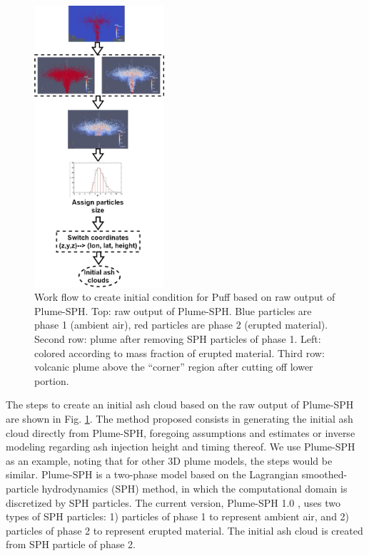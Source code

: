 \documentclass[draft,linenumbers]{agujournal2019}
\begin{document}
\begin{figure}
\center
\includegraphics[width=0.43\textwidth]{Figures/Creat_initial_Ash}
\caption{Work flow to create initial condition for Puff based on raw output of Plume-SPH. Top:  raw output of Plume-SPH. Blue particles are phase 1 (ambient air), red particles are  phase 2 (erupted material).  Second row: plume after removing SPH particles of phase 1. Left: colored according to mass fraction of erupted material. Third row:  volcanic plume above the ``corner'' region after cutting off lower portion.}
\label{fig:create-initial-ash-plume-sph}
\end{figure}

The steps to create an initial ash cloud based on the raw output of Plume-SPH are shown in Fig. \ref{fig:create-initial-ash-plume-sph}.
The method proposed consists in generating the initial ash cloud directly from Plume-SPH, foregoing  assumptions and estimates or  inverse modeling regarding ash injection height and timing thereof.
We use Plume-SPH as an example, noting that for other 3D plume models, the steps would be similar. Plume-SPH is a two-phase model based on the Lagrangian smoothed-particle hydrodynamics (SPH) method, in which the computational domain is discretized by SPH particles. The current version, Plume-SPH 1.0 \citep{cao2018plume}, uses two types of SPH particles: 1) particles of phase 1 to represent ambient air, and 2) particles of phase 2 to represent erupted material. The initial ash cloud is created from SPH particle of phase 2.
\end{document}
